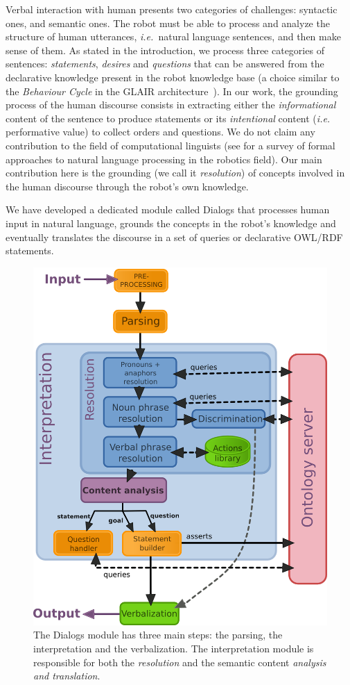 \documentclass[twocolumn]{svjour3}
\newcommand{\ie}{{\textit{i.e.~}}}
\begin{document}
Verbal interaction with human presents two categories of challenges: syntactic
ones, and semantic ones. The robot must be able to process and analyze the
structure of human utterances, \ie natural language sentences, and then make
sense of them. As stated in the introduction, we process three categories of
sentences: \emph{statements}, \emph{desires} and \emph{questions} that can be
answered from the declarative knowledge present in the robot knowledge base (a
choice similar to the \emph{Behaviour Cycle} in the GLAIR
architecture~\cite{Shapiro2009}). In our work, the grounding process of the
human discourse consists in extracting either the \emph{informational} content
of the sentence to produce statements or its \emph{intentional} content (\ie
performative value) to collect orders and questions. We do not claim any
contribution to the field of computational linguists (see \cite{Kruijff2010}
for a survey of formal approaches to natural language processing in the
robotics field). Our main contribution here is the grounding (we call it
\emph{resolution}) of concepts involved in the human discourse through the
robot's own knowledge.

We have developed a dedicated module called {\sc Dialogs} that processes human
input in natural language, grounds the concepts in the robot's knowledge and
eventually translates the discourse in a set of queries or declarative OWL/RDF
statements.

\begin{figure}[!ht]
\centering
  \includegraphics[width=0.9\linewidth]{images/dialog_module_simple.png}
  \caption{The {\sc Dialogs} module has three main steps: the parsing,
  the interpretation and the verbalization. The interpretation module is
  responsible for both the \emph{resolution} and the semantic content
  \emph{analysis and translation}.} 
  \label{fig|dialog}
\end{figure}
\end{document}
